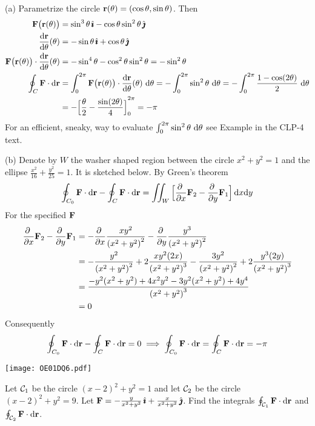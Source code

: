 \begin{solution} 
(a) Parametrize the circle $\mathbf{r}(\theta)=(\cos\theta,\sin\theta)$. Then
\begin{align*}
\vF\big(\vr(\theta)\big)
&=\sin^3\theta\,\hi -\cos\theta \sin^2\theta\,\hj\\
\diff{\vr}{\theta}(\theta)&=-\sin\theta\,\hi+\cos\theta\,\hj\\
\vF\big(\vr(\theta)\big)\cdot \diff{\vr}{\theta}(\theta)
&=-\sin^4\theta-\cos^2\theta\sin^2\theta=-\sin^2\theta\\
\oint_C\vF\cdot \dee{\vr}
&=\int_0^{2\pi}\vF\big(\vr(\theta)\big)\cdot \diff{\vr}{\theta}(\theta)\ \dee{\theta}
=-\int_0^{2\pi}\sin^2\theta\ \dee{\theta}
=-\int_0^{2\pi}\frac{1-\cos(2\theta)}{2}\ \dee{\theta}\\
&=-{\Big[\frac{\theta}{2}-\frac{\sin(2\theta)}{4}\Big]}_0^{2\pi}
=-\pi
\end{align*}
For an efficient, sneaky, way to evaluate 
$\int_0^{2\pi} \sin^2\theta\ \mathrm{d}\theta$ see Example
 in the CLP-4 text.

(b) Denote by $W$ the washer shaped region between the circle
$x^2+y^2=1$ and the ellipse $\frac{x^2}{16}+\frac{y^2}{25}=1$. 
It is sketched below. By Green's theorem
\begin{align*}
\oint_{C_0}\vF\cdot \dee{\vr}-\oint_C\vF\cdot \dee{\vr}
=\dblInt_W \Big[\pdiff{}{x}\vF_2
-\pdiff{}{y}\vF_1\Big]\,\dee{x}\dee{y}
\end{align*}
For the specified $\mathbf{F}$
\begin{align*}
\pdiff{}{x}\vF_2
-\pdiff{}{y}\vF_1
&=-\pdiff{}{x}\frac{xy^2}{ {(x^2+y^2)}^2}
-\pdiff{}{y}\frac{y^3}{ {(x^2+y^2)}^2}\\
&=-\frac{y^2}{ {(x^2+y^2)}^2}+2\frac{xy^2(2x)}{ {(x^2+y^2)}^3}
-\frac{3y^2}{ {(x^2+y^2)}^2}+2\frac{y^3(2y)}{ {(x^2+y^2)}^3}\\
&=\frac{-y^2(x^2+y^2)+4x^2y^2-3y^2(x^2+y^2)+4y^4}{ {(x^2+y^2)}^3}\\
&=0
\end{align*}
Consequently
$$
\oint_{C_0}\mathbf{F}\cdot \mathrm{d}\mathbf{r}-\oint_C\mathbf{F}\cdot \mathrm{d}\mathbf{r}=0
\implies
\oint_{C_0}\mathbf{F}\cdot \mathrm{d}\mathbf{r}=\oint_C\mathbf{F}\cdot \mathrm{d}\mathbf{r}=-\pi
$$

\begin{center}
   \texttt{[image: OE01DQ6.pdf]}
\end{center}

\end{solution}

\begin{question}[M317 2001A] %
Let $\mathcal{C}_1$ be the circle $(x-2)^2+y^2=1$ and let $\mathcal{C}_2$ be
the circle $(x-2)^2+y^2=9$. Let 
$\mathbf{F}=-\frac{y}{x^2+y^2}\,\hat{\pmb{\imath}}+\frac{x}{x^2+y^2}\,\hat{\pmb{\jmath}}$. Find the integrals
$\oint_{\mathcal{C}_1}\mathbf{F}\cdot \mathrm{d}\mathbf{r}$ and $\oint_{\mathcal{C}_2}\mathbf{F}\cdot \mathrm{d}\mathbf{r}$.
\end{question}

